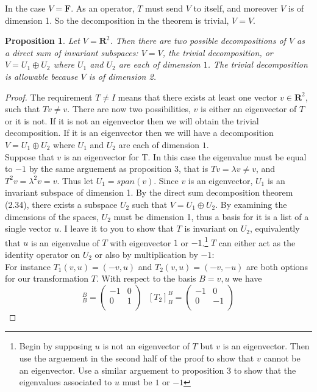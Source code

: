 \documentclass{article}
\theoremstyle{problemstyle}
\newtheorem{proposition}{Proposition}
\begin{document}
In the case $V = \textbf{F}$. As an operator, $T$ must send $V$ to itself, and moreover $V$ is of dimension 1. So the decomposition in the theorem is trivial, $V = V$. \\

\begin{proposition}
Let $V = \textbf{R}^2$. Then there are two possible decompositions of $V$ as a direct sum of invariant subspaces: $V = V$, the trivial decomposition, or $V = U_1 \oplus U_2$ where $U_1$ and $U_2$ are each of dimension $1$. The trivial decomposition is allowable because $V$ is of dimension 2.
\end{proposition}

\begin{proof}
The requirement $T \neq I$ means that there exists at least one vector $v \in \textbf{R}^2$, such that $Tv \neq v$. There are now two possibilities, $v$ is either an eigenvector of $T$ or it is not. If it is not an eigenvector then we will obtain the trivial decomposition. If it is an eigenvector then we will have a decomposition $V = U_1 \oplus U_2$ where $U_1$ and $U_2$ are each of dimension $1$.\\

Suppose that $v$ is an eigenvector for T. In this case the eigenvalue must be equal to $-1$ by the same arguement as proposition 3, that is  $Tv = \lambda v \neq v$, and $T^2v = \lambda^2v = v$. Thus let $U_1 = span(v)$. Since $v$ is an eigenvector, $U_1$ is an invariant subspace of dimension 1. By the direct sum decomposition theorem (2.34), there exists a subspace $U_2$ such that $V = U_1 \oplus U_2$. By examining the dimensions of the spaces, $U_2$ must be dimension 1, thus a basis for it is a list of a single vector $u$. I leave it to you to show that $T$ is invariant on $U_2$, equivalently that $u$ is an eigenvalue of $T$ with eigenvector $1$ or $-1$.\footnote{Begin by supposing $u$ is not an eigenvector of $T$ but $v$ is an eigenvector. Then use the arguement in the second half of the proof to show that $v$ cannot be an eigenvector. Use a similar arguement to proposition 3 to show that the eigenvalues associated to $u$ must be $1$ or $-1$}  $T$ can either act as the identity operator on $U_2$ or also by multiplication by $-1$:\\ 

For instance $T_1(v,u) = (-v,u)$ and $T_2(v,u) = (-v,-u)$ are both options for our transformation $T$. With respect to the basis $B = v,u$ we have 
\begin{equation}
[T_1]_{B}^B = 
\begin{pmatrix} -1 & 0 \\
 0 & 1  \\
\end{pmatrix}  \ \ \ 
[T_2]_{B}^{B} = 
\begin{pmatrix} -1 & 0 \\
 0 & -1  \\
\end{pmatrix}
\end{equation}


\end{proof}
\end{document}
